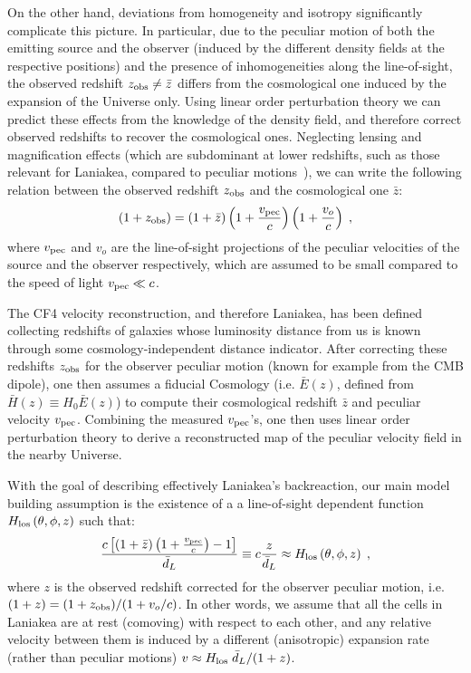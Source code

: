 \documentclass[notitlepage,nofootinbib]{revtex4-1}
\begin{document}
On the other hand, deviations from homogeneity and isotropy significantly complicate this picture. In particular, due to the peculiar motion of both the emitting source and the observer (induced by the different density fields at the respective positions) and the presence of inhomogeneities along the line-of-sight, the observed redshift $z_{\rm{obs}}\neq \bar{z}$ differs from the cosmological one induced by the expansion of the Universe only. Using linear order perturbation theory we can predict these effects from the knowledge of the density field, and therefore correct observed redshifts to recover the cosmological ones. Neglecting lensing and magnification effects (which are subdominant at lower redshifts, such as those relevant for Laniakea, compared to peculiar motions~\cite{2011ApJ...741...67D,Hui:2005nm}), we can write the following relation between the observed redshift $z_{\rm obs}$ and the cosmological one $\bar{z}$:
\begin{equation}
    \left(1+z_{\rm obs}\right)=\left(1+\bar{z}\right)\left(1+\frac{v_{\rm pec}}{c}\right)\left(1+\frac{v_{o}}{c}\right)\;,
\end{equation}
where $v_{\rm pec}$ and $v_{o}$ are the line-of-sight projections of the peculiar velocities of the source and the observer respectively, which are assumed to be small compared to the speed of light $v_{\rm pec}\ll c$.

The CF4 velocity reconstruction, and therefore Laniakea, has been defined collecting redshifts of galaxies whose luminosity distance from us is known through some cosmology-independent distance indicator. After correcting these redshifts $z_{\rm obs}$  for the observer peculiar motion (known for example from the CMB dipole), one then assumes a fiducial Cosmology (i.e. $\bar{E}(z)$, defined from $\bar{H}(z)\equiv H_0 \bar{E}(z)$) to compute their cosmological redshift $\bar{z}$ and peculiar velocity $v_{\rm pec}$. Combining the measured $v_{\rm pec}$'s, one then uses linear order perturbation theory to derive a reconstructed map of the peculiar velocity field in the nearby Universe.   

With the goal of describing effectively Laniakea's backreaction, our main model building assumption is the existence of a a line-of-sight dependent function $H_{\rm{los}}\left(\theta, \phi,z\right)$ such that:
\begin{equation}\label{modelbuilding}
 \frac{ c\left[\left(1+\bar{z}\right)\left(1+ \frac{v_{\rm{pec}}}{c}\right) - 1\right]}{\bar{d}_L} \equiv c\frac{z}{\bar{d}_L}\approx H_{\rm{los}}\left(\theta, \phi,z\right)\;,
\end{equation}
where $z$ is the observed redshift corrected for the observer peculiar motion, i.e. $(1+z)=(1+z_{\rm{obs}})/(1+v_o/c)$. 
In other words, we assume that all the cells in Laniakea are at rest (comoving) with respect to each other, and any relative velocity between them is induced by a different (anisotropic) expansion rate (rather than peculiar motions) $v\approx H_{\rm{los}} \;\bar{d}_L/(1+z) $.
\end{document}

